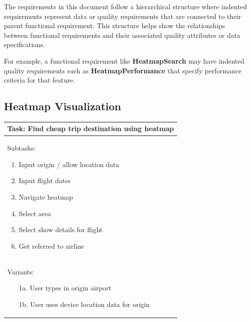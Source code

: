 The requirements in this document follow a hierarchical structure where indented requirements represent data or quality requirements that are connected to their parent functional requirement. This structure helps show the relationships between functional requirements and their associated quality attributes or data specifications.

For example, a functional requirement like \textbf{HeatmapSearch} may have indented quality requirements such as \textbf{HeatmapPerformance} that specify performance criteria for that feature.

\subsection{Heatmap Visualization}

\begin{tabular}{|p{}|}
    \hline
    \textbf{Task:  Find cheap trip destination using heatmap}\\
    \hline
    Subtasks:
    \begin{enumerate}
        \item Input origin / allow location data
        \item Input flight dates
        \item Navigate heatmap
        \item Select area
        \item Select show details for flight
        \item Get referred to airline
    \end{enumerate}\\
    \hline
    Variants:
    \begin{enumerate}
        \item[1a.] User types in origin airport
        \item[1b.] User uses device location data for origin
    \end{enumerate}\\
    \hline
\end{tabular}

